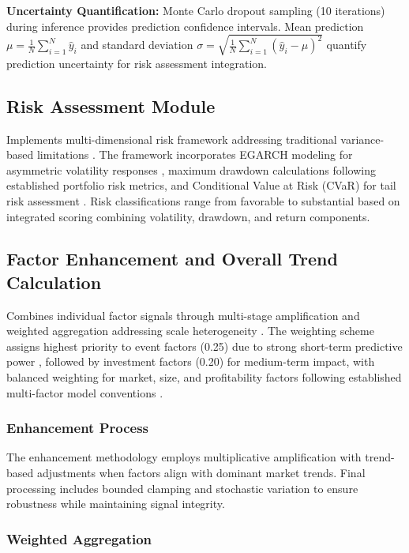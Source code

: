 \documentclass[3p,times,procedia]{elsarticle}
\begin{document}
\textbf{Uncertainty Quantification:} Monte Carlo dropout sampling (10 iterations) during inference provides prediction confidence intervals. Mean prediction $\mu = \frac{1}{N}\sum_{i=1}^{N} \hat{y}_i$ and standard deviation $\sigma = \sqrt{\frac{1}{N}\sum_{i=1}^{N} (\hat{y}_i - \mu)^2}$ quantify prediction uncertainty for risk assessment integration.

\subsection{{Risk Assessment Module}}

Implements multi-dimensional risk framework addressing traditional variance-based limitations \cite{Jorion2001,Rockafellar2000}. The framework incorporates EGARCH modeling for asymmetric volatility responses \cite{Nelson1991}, maximum drawdown calculations following established portfolio risk metrics, and Conditional Value at Risk (CVaR) for tail risk assessment \cite{Rockafellar2000}. Risk classifications range from favorable to substantial based on integrated scoring combining volatility, drawdown, and return components.

\subsection{{Factor Enhancement and Overall Trend Calculation}}

Combines individual factor signals through multi-stage amplification and weighted aggregation addressing scale heterogeneity \cite{Harvey2016,FAMA1993}. The weighting scheme assigns highest priority to event factors (0.25) due to strong short-term predictive power \cite{Daniel1998}, followed by investment factors (0.20) for medium-term impact, with balanced weighting for market, size, and profitability factors following established multi-factor model conventions \cite{FAMA1993,Carhart1997}.

\subsubsection{{Enhancement Process}}

The enhancement methodology employs multiplicative amplification with trend-based adjustments when factors align with dominant market trends. Final processing includes bounded clamping and stochastic variation to ensure robustness while maintaining signal integrity.

\subsubsection{{Weighted Aggregation}}
\end{document}

